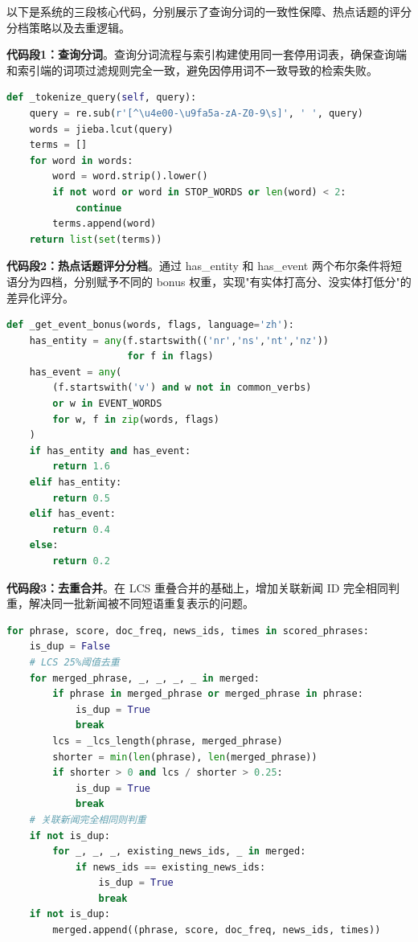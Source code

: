 \documentclass[UTF8,a4paper,zihao=5]{ctexart}
\begin{document}
以下是系统的三段核心代码，分别展示了查询分词的一致性保障、热点话题的评分分档策略以及去重逻辑。

\textbf{代码段1：查询分词}。查询分词流程与索引构建使用同一套停用词表，确保查询端和索引端的词项过滤规则完全一致，避免因停用词不一致导致的检索失败。

\begin{lstlisting}[title=查询分词函数,frame=trbl,language={Python}]
def _tokenize_query(self, query):
    query = re.sub(r'[^\u4e00-\u9fa5a-zA-Z0-9\s]', ' ', query)
    words = jieba.lcut(query)
    terms = []
    for word in words:
        word = word.strip().lower()
        if not word or word in STOP_WORDS or len(word) < 2:
            continue
        terms.append(word)
    return list(set(terms))
\end{lstlisting}

\textbf{代码段2：热点话题评分分档}。通过 has\_entity 和 has\_event 两个布尔条件将短语分为四档，分别赋予不同的 bonus 权重，实现"有实体打高分、没实体打低分"的差异化评分。

\begin{lstlisting}[title=事件性加权得分,frame=trbl,language={Python}]
def _get_event_bonus(words, flags, language='zh'):
    has_entity = any(f.startswith(('nr','ns','nt','nz')) 
                     for f in flags)
    has_event = any(
        (f.startswith('v') and w not in common_verbs) 
        or w in EVENT_WORDS
        for w, f in zip(words, flags)
    )
    if has_entity and has_event:
        return 1.6
    elif has_entity:
        return 0.5
    elif has_event:
        return 0.4
    else:
        return 0.2
\end{lstlisting}

\textbf{代码段3：去重合并}。在 LCS 重叠合并的基础上，增加关联新闻 ID 完全相同判重，解决同一批新闻被不同短语重复表示的问题。

\begin{lstlisting}[title=LCS合并与news_ids判重,frame=trbl,language={Python}]
for phrase, score, doc_freq, news_ids, times in scored_phrases:
    is_dup = False
    # LCS 25%阈值去重
    for merged_phrase, _, _, _, _ in merged:
        if phrase in merged_phrase or merged_phrase in phrase:
            is_dup = True
            break
        lcs = _lcs_length(phrase, merged_phrase)
        shorter = min(len(phrase), len(merged_phrase))
        if shorter > 0 and lcs / shorter > 0.25:
            is_dup = True
            break
    # 关联新闻完全相同则判重
    if not is_dup:
        for _, _, _, existing_news_ids, _ in merged:
            if news_ids == existing_news_ids:
                is_dup = True
                break
    if not is_dup:
        merged.append((phrase, score, doc_freq, news_ids, times))
\end{lstlisting}
\end{document}
